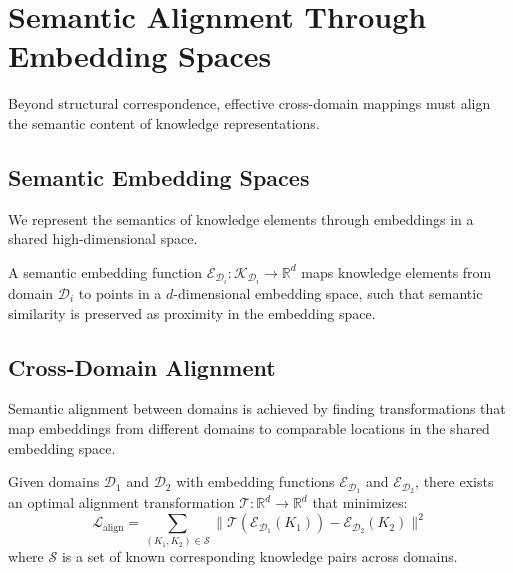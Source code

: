 \section{Semantic Alignment Through Embedding Spaces}

Beyond structural correspondence, effective cross-domain mappings must align the semantic content of knowledge representations.

\subsection{Semantic Embedding Spaces}

We represent the semantics of knowledge elements through embeddings in a shared high-dimensional space.

\begin{definition}
A semantic embedding function $\mathcal{E}_{\mathcal{D}_i}: \mathcal{K}_{\mathcal{D}_i} \rightarrow \mathbb{R}^d$ maps knowledge elements from domain $\mathcal{D}_i$ to points in a $d$-dimensional embedding space, such that semantic similarity is preserved as proximity in the embedding space.
\end{definition}

\subsection{Cross-Domain Alignment}

Semantic alignment between domains is achieved by finding transformations that map embeddings from different domains to comparable locations in the shared embedding space.

\begin{theorem}
Given domains $\mathcal{D}_1$ and $\mathcal{D}_2$ with embedding functions $\mathcal{E}_{\mathcal{D}_1}$ and $\mathcal{E}_{\mathcal{D}_2}$, there exists an optimal alignment transformation $\mathcal{T}: \mathbb{R}^d \rightarrow \mathbb{R}^d$ that minimizes:
\begin{equation}
\mathcal{L}_{\text{align}} = \sum_{(K_1, K_2) \in \mathcal{S}} \|\mathcal{T}(\mathcal{E}_{\mathcal{D}_1}(K_1)) - \mathcal{E}_{\mathcal{D}_2}(K_2)\|^2
\end{equation}
where $\mathcal{S}$ is a set of known corresponding knowledge pairs across domains.
\end{theorem}

